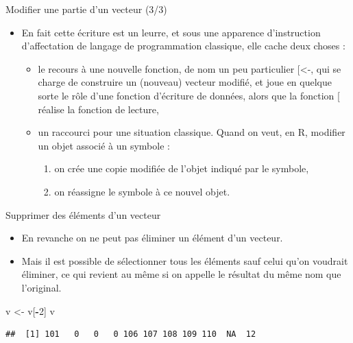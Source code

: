 \documentclass[
  ignorenonframetext,
]{beamer}
\newenvironment{Shaded}{\begin{snugshade}}{\end{snugshade}}
\newcommand{\DecValTok}[1]{\textcolor[rgb]{0.00,0.00,0.81}{#1}}
\newcommand{\NormalTok}[1]{#1}
\newcommand{\OtherTok}[1]{\textcolor[rgb]{0.56,0.35,0.01}{#1}}
\newcommand{\SpecialCharTok}[1]{\textcolor[rgb]{0.81,0.36,0.00}{\textbf{#1}}}
\providecommand{\tightlist}{%
  \setlength{\itemsep}{0pt}\setlength{\parskip}{0pt}}
\begin{document}
\begin{frame}{Modifier une partie d'un vecteur (3/3)}
\protect\hypertarget{modifier-une-partie-dun-vecteur-33}{}
\begin{itemize}
\tightlist
\item
  En fait cette écriture est un leurre, et sous une apparence
  d'instruction d'affectation de langage de programmation classique,
  elle cache deux choses :

  \begin{itemize}
  \tightlist
  \item
    le recours à une nouvelle fonction, de nom un peu particulier
    {[}\textless-, qui se charge de construire un (nouveau) vecteur
    modifié, et joue en quelque sorte le rôle d'une fonction d'écriture
    de données, alors que la fonction {[} réalise la fonction de
    lecture,
  \item
    un raccourci pour une situation classique. Quand on veut, en R,
    modifier un objet associé à un symbole :

    \begin{enumerate}
    \tightlist
    \item
      on crée une copie modifiée de l'objet indiqué par le symbole,
    \item
      on réassigne le symbole à ce nouvel objet.
    \end{enumerate}
  \end{itemize}
\end{itemize}
\end{frame}

\begin{frame}[fragile]{Supprimer des éléments d'un vecteur}
\protect\hypertarget{supprimer-des-uxe9luxe9ments-dun-vecteur}{}
\begin{itemize}
\tightlist
\item
  En revanche on ne peut pas éliminer un élément d'un vecteur.
\item
  Mais il est possible de sélectionner tous les éléments sauf celui
  qu'on voudrait éliminer, ce qui revient au même si on appelle le
  résultat du même nom que l'original.
\end{itemize}

\tiny

\begin{Shaded}
\begin{Highlighting}[]
\NormalTok{v }\OtherTok{\textless{}{-}}\NormalTok{ v[}\SpecialCharTok{{-}}\DecValTok{2}\NormalTok{]}
\NormalTok{v}
\end{Highlighting}
\end{Shaded}

\begin{verbatim}
##  [1] 101   0   0   0 106 107 108 109 110  NA  12
\end{verbatim}

\normalsize
\end{frame}
\end{document}

